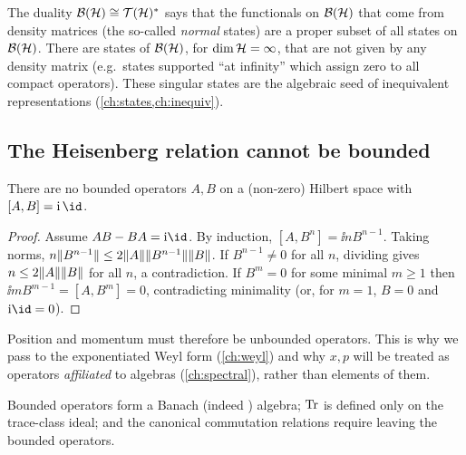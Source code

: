 \begin{whatwrong}
The duality $\mathcal{B}(\mathcal{H})\cong\mathcal T(\mathcal{H})^*$ says that the functionals on $\mathcal{B}(\mathcal{H})$ that come from density matrices (the so-called \emph{normal} states) are a proper subset of all states on $\mathcal{B}(\mathcal{H})$. There are states of $\mathcal{B}(\mathcal{H})$, for $\dim\mathcal{H}=\infty$, that are not given by any density matrix (e.g.\ states supported ``at infinity'' which assign zero to all compact operators). These singular states are the algebraic seed of inequivalent representations (\cref{ch:states,ch:inequiv}).
\end{whatwrong}

\subsection{The Heisenberg relation cannot be bounded}

\begin{theorem}
There are no bounded operators $A,B$ on a (non-zero) Hilbert space with $[A,B]=\ii\,\id$.
\end{theorem}
\begin{proof}
Assume $AB-BA=\ii\id$. By induction, $[A,B^n]=\ii nB^{n-1}$. Taking norms, $n\lVert B^{n-1}\rVert\le2\lVert A\rVert\lVert B^{n-1}\rVert\lVert B\rVert$. If $B^{n-1}\neq0$ for all $n$, dividing gives $n\le2\lVert A\rVert\lVert B\rVert$ for all $n$, a contradiction. If $B^{m}=0$ for some minimal $m\ge1$ then $\ii m B^{m-1}=[A,B^m]=0$, contradicting minimality (or, for $m=1$, $B=0$ and $\ii\id=0$).
\end{proof}

Position and momentum must therefore be unbounded operators. This is why we pass to the exponentiated Weyl form (\cref{ch:weyl}) and why $x,p$ will be treated as operators \emph{affiliated} to algebras (\cref{ch:spectral}), rather than elements of them.

\begin{keyidea}
Bounded operators form a Banach (indeed \cstar) algebra; $\operatorname{Tr}$ is defined only on the trace-class ideal; and the canonical commutation relations require leaving the bounded operators.
\end{keyidea}

